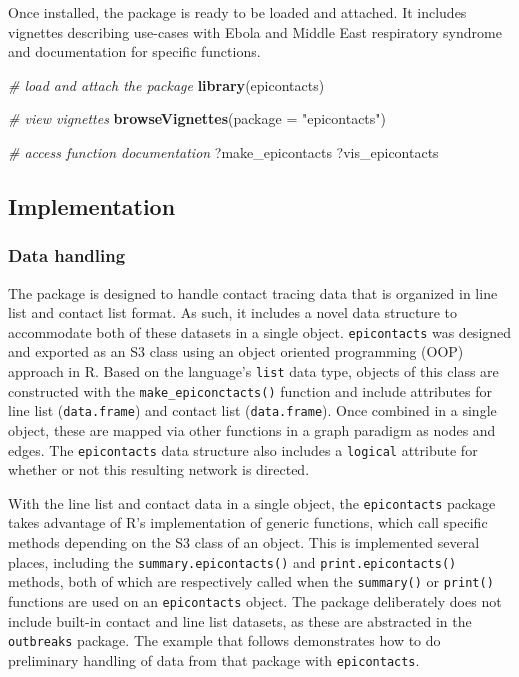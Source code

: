 \documentclass[9pt,a4paper,]{extarticle}
\newenvironment{Shaded}{\begin{snugshade}}{\end{snugshade}}
\newcommand{\KeywordTok}[1]{\textcolor[rgb]{0.13,0.29,0.53}{\textbf{#1}}}
\newcommand{\DataTypeTok}[1]{\textcolor[rgb]{0.13,0.29,0.53}{#1}}
\newcommand{\StringTok}[1]{\textcolor[rgb]{0.31,0.60,0.02}{#1}}
\newcommand{\CommentTok}[1]{\textcolor[rgb]{0.56,0.35,0.01}{\textit{#1}}}
\newcommand{\NormalTok}[1]{#1}
\theoremstyle{definition}
\theoremstyle{definition}
\theoremstyle{definition}
\theoremstyle{remark}
\begin{document}
Once installed, the package is ready to be loaded and attached. It includes vignettes describing use-cases with Ebola and Middle East respiratory syndrome and documentation for specific functions.

\begin{Shaded}
\begin{Highlighting}[]
\CommentTok{# load and attach the package}
\KeywordTok{library}\NormalTok{(epicontacts)}
\end{Highlighting}
\end{Shaded}

\begin{Shaded}
\begin{Highlighting}[]
\CommentTok{# view vignettes}
\KeywordTok{browseVignettes}\NormalTok{(}\DataTypeTok{package =} \StringTok{"epicontacts"}\NormalTok{)}

\CommentTok{# access function documentation}
\NormalTok{?make_epicontacts}
\NormalTok{?vis_epicontacts}
\end{Highlighting}
\end{Shaded}

\subsection{Implementation}\label{implementation}

\subsubsection{Data handling}\label{data-handling}

The package is designed to handle contact tracing data that is organized in line list and contact list format. As such, it includes a novel data structure to accommodate both of these datasets in a single object. \texttt{epicontacts} was designed and exported as an S3 class using an object oriented programming (OOP) approach in R. Based on the language's \texttt{list} data type, objects of this class are constructed with the \texttt{make\_epiconctacts()} function and include attributes for line list (\texttt{data.frame}) and contact list (\texttt{data.frame}). Once combined in a single object, these are mapped via other functions in a graph paradigm as nodes and edges. The \texttt{epicontacts} data structure also includes a \texttt{logical} attribute for whether or not this resulting network is directed.

With the line list and contact data in a single object, the \texttt{epicontacts} package takes advantage of R's implementation of generic functions, which call specific methods depending on the S3 class of an object. This is implemented several places, including the \texttt{summary.epicontacts()} and \texttt{print.epicontacts()} methods, both of which are respectively called when the \texttt{summary()} or \texttt{print()} functions are used on an \texttt{epicontacts} object. The package deliberately does not include built-in contact and line list datasets, as these are abstracted in the \texttt{outbreaks} package\citep{outbreaks}. The example that follows demonstrates how to do preliminary handling of data from that package with \texttt{epicontacts}.
\end{document}
